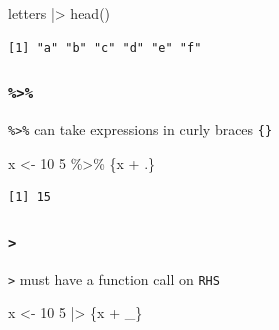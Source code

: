 \documentclass[
  letterpaper,
  DIV=11,
  numbers=noendperiod]{scrreprt}
\newenvironment{Shaded}{\begin{snugshade}}{\end{snugshade}}
\newcommand{\DecValTok}[1]{\textcolor[rgb]{0.68,0.00,0.00}{#1}}
\newcommand{\FunctionTok}[1]{\textcolor[rgb]{0.28,0.35,0.67}{#1}}
\newcommand{\NormalTok}[1]{\textcolor[rgb]{0.00,0.23,0.31}{#1}}
\newcommand{\OtherTok}[1]{\textcolor[rgb]{0.00,0.23,0.31}{#1}}
\newcommand{\SpecialCharTok}[1]{\textcolor[rgb]{0.37,0.37,0.37}{#1}}
\begin{document}
\begin{tcolorbox}
\begin{tcolorbox}
\begin{Shaded}
\begin{Highlighting}[]
\NormalTok{letters }\SpecialCharTok{|\textgreater{}} \FunctionTok{head}\NormalTok{()}
\end{Highlighting}
\end{Shaded}

\begin{verbatim}
[1] "a" "b" "c" "d" "e" "f"
\end{verbatim}

\end{tcolorbox}

\begin{tcolorbox}[enhanced jigsaw, bottomtitle=1mm, bottomrule=.15mm, toprule=.15mm, opacityback=0, leftrule=.75mm, breakable, colback=white, toptitle=1mm, left=2mm, coltitle=black, titlerule=0mm, opacitybacktitle=0.6, title=\textcolor{quarto-callout-note-color}{\faInfo}\hspace{0.5em}{Anonymous Functions}, rightrule=.15mm, arc=.35mm, colframe=quarto-callout-note-color-frame, colbacktitle=quarto-callout-note-color!10!white]

\subsubsection{\texorpdfstring{\texttt{\%\textgreater{}\%}}{\%\textgreater\%}}

\texttt{\%\textgreater{}\%} can take expressions in curly braces
\texttt{\{\}}

\begin{Shaded}
\begin{Highlighting}[]
\NormalTok{x }\OtherTok{\textless{}{-}} \DecValTok{10}
\DecValTok{5} \SpecialCharTok{\%\textgreater{}\%}\NormalTok{ \{x }\SpecialCharTok{+}\NormalTok{ .\}}
\end{Highlighting}
\end{Shaded}

\begin{verbatim}
[1] 15
\end{verbatim}

\subsubsection{\texorpdfstring{\texttt{\textbar{}\textgreater{}}}{\textbar\textgreater{}}}

\texttt{\textbar{}\textgreater{}} must have a function call on
\texttt{RHS}

\begin{Shaded}
\begin{Highlighting}[]
\NormalTok{x }\OtherTok{\textless{}{-}} \DecValTok{10}
\DecValTok{5} \SpecialCharTok{|\textgreater{}}\NormalTok{ \{x }\SpecialCharTok{+}\NormalTok{ \_\}}
\end{Highlighting}
\end{Shaded}


\end{tcolorbox}
\end{tcolorbox}
\end{document}
